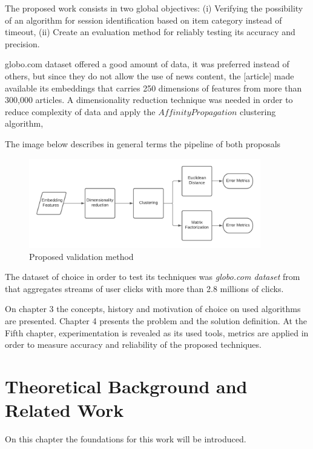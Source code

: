 \documentclass[ecp,tc,english]{iiufrgs}
\begin{document}
The proposed work consists in two global objectives: (i) Verifying the possibility of an algorithm for session identification based on item category instead of timeout, 
(ii) Create an evaluation method for reliably testing its accuracy and precision.

globo.com dataset offered a good amount of data, it was preferred instead of others, but since they do not allow the use of news content, the [article] made available its embeddings that carries 250 dimensions of features from more than 300,000 articles. A dimensionality reduction technique was needed in order to reduce complexity of data and apply the \(Affinity Propagation\) clustering algorithm,

The image below describes in general terms the pipeline of both proposals

\begin{figure}[!ht]
    \centering
    \includegraphics[width=0.9\textwidth]{images/experiment.png}
    \caption{Proposed validation method}
    \label{fig:method_architecture}
\end{figure}

The dataset of choice in order to test its techniques was  \textit{globo.com dataset} from \cite{deSouzaPereiraMoreira:2018:CDL:3240323.3240331} 
that aggregates streams of user clicks with more than 2.8 millions of clicks.

On chapter 3 the concepts, history and motivation of choice on used algorithms are presented. Chapter 4 presents the problem and the solution definition.
At the Fifth chapter, experimentation is revealed as its used tools, metrics are applied in order to measure accuracy and reliability of the proposed techniques.


\chapter{Theoretical Background and Related Work}
On this chapter the foundations for this work will be introduced.
\end{document}
